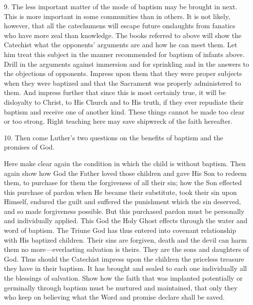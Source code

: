 9. The less important matter of the mode of baptism may be brought in next. This is more important in some communities than in others. It is not likely, however, that all the catechumens will escape future onslaughts from fanatics who have more zeal than knowledge. The books referred to above will show the Catechist what the opponents’ arguments are and how he can meet them. Let him treat this subject in the manner recommended for baptism of infants above. Drill in the arguments against immersion and for sprinkling and in the answers to the objections of opponents. Impress upon them that they were proper subjects when they were 
baptized and that the Sacrament was properly administered to them. And impress further that since this is most certainly true, it will be disloyalty to Christ, to His Church and to His truth, if they ever repudiate their baptism and receive one of another kind. These things cannot be made too clear or too strong. Right teaching here may save shipwreck of the faith hereafter.

10. Then come Luther’s two questions on the benefits of baptism and the promises of God.

Here make clear again the condition in which the child is without baptism. Then again show how God the Father loved those children and gave His Son to redeem them, to purchase for them the forgiveness of all their sin; how the Son effected this purchase of pardon when He became their substitute, took their sin upon Himself, endured the guilt and suffered the punishment which the sin deserved, and so made forgiveness possible. But this purchased pardon must be personally and individually applied. This God the Holy Ghost effects through the water and word of baptism. The Triune God has thus entered into covenant relationship with His baptized children. Their sins are forgiven, death and the devil can harm them no more—everlasting salvation is theirs. They are the sons and daughters of God. Thus should the Catechist impress upon the children the priceless treasure they have in their 
baptism. It has brought and sealed to each one individually all the blessings of salvation. Show how the faith that was implanted potentially or germinally through baptism must be nurtured and maintained, that only they who keep on believing what the Word and promise declare shall be saved.

